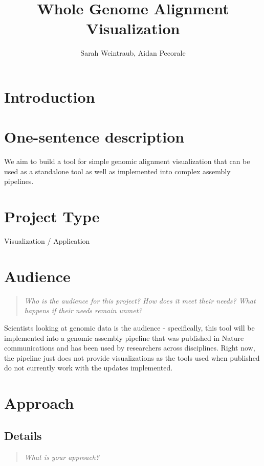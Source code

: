 \documentclass{proc}
\begin{document}
\title{Whole Genome Alignment Visualization}

\author{Sarah Weintraub, Aidan Pecorale }

\maketitle

\section{Introduction}



\section{One-sentence description}

We aim to build a tool for simple genomic alignment visualization that can be used as a standalone tool as well as implemented into complex assembly pipelines.

\section{Project Type}

Visualization / Application

\section{Audience} 
\begin{quote}
\textit{Who is the audience for this project? 
How does it meet their needs? 
What happens if their needs remain unmet?}
\end{quote}

Scientists looking at genomic data is the audience - specifically, this tool will be implemented into a genomic assembly pipeline that was published in Nature communications and has been used by researchers across disciplines. Right now, the pipeline just does not provide visualizations as the tools used when published do not currently work with the updates implemented.

\section{Approach}
\subsection{Details}
\begin{quote}
\textit{What is your approach?}
\end{quote}
\end{document}
